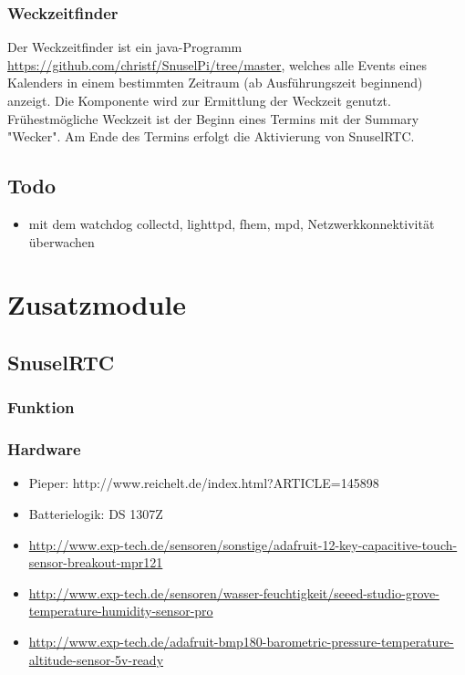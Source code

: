\documentclass[a4paper,twoside,titlepage,normalheadings,tocleft,bibtotoc]{scrartcl}
\begin{document}
\subsubsection{Weckzeitfinder}
Der Weckzeitfinder ist ein java-Programm \url{https://github.com/christf/SnuselPi/tree/master}, welches alle Events eines Kalenders in einem bestimmten Zeitraum (ab Ausführungszeit beginnend) anzeigt. Die Komponente wird zur Ermittlung der Weckzeit genutzt. Frühestmögliche Weckzeit ist der Beginn eines Termins mit der Summary "Wecker". Am Ende des Termins erfolgt die Aktivierung von SnuselRTC.

\subsection{Todo}
\begin{itemize}
\item mit dem watchdog collectd, lighttpd, fhem, mpd, Netzwerkkonnektivität überwachen
\end{itemize}



\section{Zusatzmodule}
\subsection{SnuselRTC}
\subsubsection{Funktion}
\subsubsection{Hardware}
\begin{itemize}
\item Pieper: http://www.reichelt.de/index.html?ARTICLE=145898
\item Batterielogik: DS 1307Z
\item \url{http://www.exp-tech.de/sensoren/sonstige/adafruit-12-key-capacitive-touch-sensor-breakout-mpr121}
\item \url{http://www.exp-tech.de/sensoren/wasser-feuchtigkeit/seeed-studio-grove-temperature-humidity-sensor-pro}
\item \url{http://www.exp-tech.de/adafruit-bmp180-barometric-pressure-temperature-altitude-sensor-5v-ready}
\end{itemize}
\end{document}
